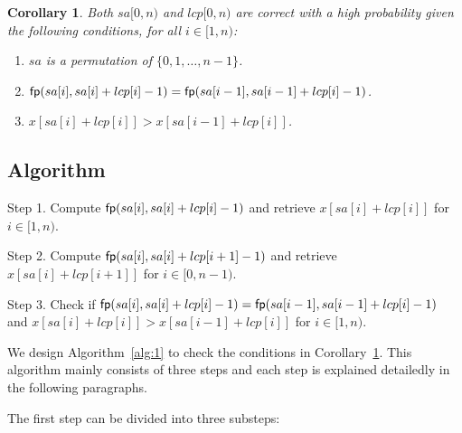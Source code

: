 \documentclass[10pt,journal,compsoc]{IEEEtran}
\newtheorem{Corollary}{Corollary}
\begin{document}
	\begin{Corollary} \label{corollary:1}
		Both $sa[0, n)$ and $lcp[0, n)$ are correct with a high probability given the following conditions, for all $i \in [1, n)$:
		
		\begin{enumerate}[(1)]
			\item
			$sa$ is a permutation of $\{0, 1, \dots, n - 1\}$.
			
			\item
			${\sf fp}(sa[i], sa[i] + lcp[i] - 1) = {\sf fp}(sa[i - 1], sa[i - 1] + lcp[i] - 1)$.
			
			\item
			$x[sa[i] + lcp[i]] > x[sa[i - 1] + lcp[i]]$.
		\end{enumerate}
		
		
		
		
	\end{Corollary}
	
	\subsection{Algorithm} \label{sec:method1:algorithm}
	
	\begin{algorithm*}
		
		\SetAlgoNoLine
		
		
		Step 1. Compute ${\sf fp}(sa[i], sa[i] + lcp[i] - 1)$ and retrieve $x[sa[i] + lcp[i]]$ for $i \in [1, n)$.
		
		Step 2. Compute ${\sf fp}(sa[i], sa[i] + lcp[i + 1] - 1)$ and retrieve $x[sa[i] + lcp[i + 1]]$ for $i \in [0, n - 1)$.
		
		Step 3. Check if ${\sf fp}(sa[i], sa[i] + lcp[i] - 1) = {\sf fp}(sa[i - 1], sa[i - 1] + lcp[i] - 1)$ and $x[sa[i] + lcp[i]] > x[sa[i - 1] + lcp[i]]$ for $i \in [1, n)$.
		
		\caption{The algorithm using Method A.}
		
		\label{alg:1}
		
	\end{algorithm*}
	
	We design Algorithm~\ref{alg:1} to check the conditions in Corollary~\ref{corollary:1}. This algorithm mainly consists of three steps and each step is explained detailedly in the following paragraphs.
	
	\vspace{1ex}  The first step can be divided into three substeps:
	
\end{document}
